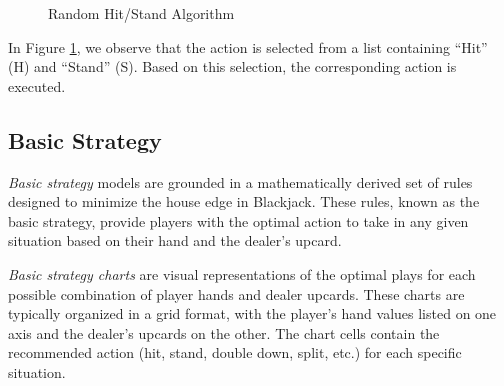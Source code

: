 \documentclass[a4paper,12pt]{report}
\begin{document}
\begin{figure}[H]
\caption{Random Hit/Stand Algorithm}
\label{fig:randomhitstand}
\end{figure}

In Figure \ref{fig:randomhitstand}, we observe that the action is selected from a list containing “Hit” (H) and “Stand” (S). Based on this selection, the corresponding action is executed.

\subsection{Basic Strategy}
\label{basic_strategy}
\textit{Basic strategy} models are grounded in a mathematically derived set of rules designed to minimize the house edge in Blackjack. These rules, known as the basic strategy, provide players with the optimal action to take in any given situation based on their hand and the dealer's upcard.

\textit{Basic strategy charts} are visual representations of the optimal plays for each possible combination of player hands and dealer upcards. These charts are typically organized in a grid format, with the player's hand values listed on one axis and the dealer's upcards on the other. The chart cells contain the recommended action (hit, stand, double down, split, etc.) for each specific situation.

\vspace{5cm}
\end{document}
